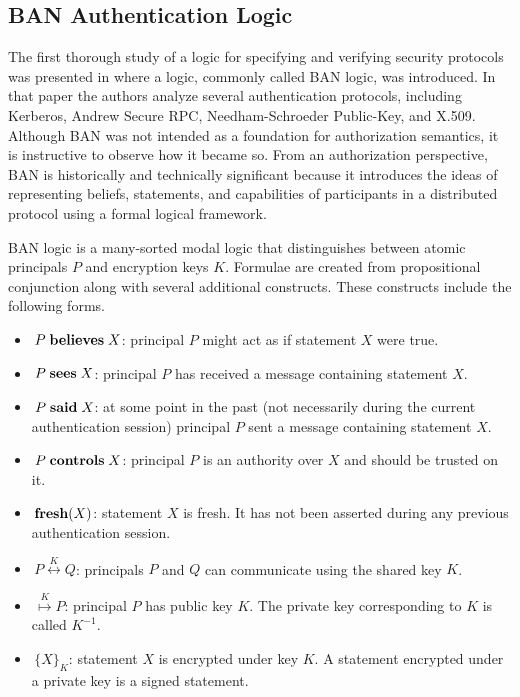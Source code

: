 \subsection{BAN Authentication Logic}

The first thorough study of a logic for specifying and verifying
security protocols was presented in \cite{Burrows:LA} where a logic,
commonly called BAN logic, was introduced.  In that paper the authors
analyze several authentication protocols, including Kerberos, Andrew
Secure RPC, Needham-Schroeder Public-Key, and X.509.  Although BAN was
not intended as a foundation for authorization semantics, it is
instructive to observe how it became so.  From an authorization
perspective, BAN is historically and technically significant because
it introduces the ideas of representing beliefs, statements, and
capabilities of participants in a distributed protocol using a formal
logical framework.

BAN logic is a many-sorted modal logic that distinguishes between
atomic principals $P$ and encryption keys $K$. Formulae are created from
propositional conjunction along with several additional
constructs. These constructs include the following forms.
\begin{itemize}
\item $\,P \;\textbf{believes}\; X$: principal $P$ might act as
  if statement $X$ were true.
\item $\,P \;\textbf{sees}\; X$: principal $P$ has received a
  message containing statement $X$.
\item $\,P \;\textbf{said}\; X$: at some point in the past (not
  necessarily during the current authentication session) principal $P$
  sent a message containing statement $X$.
\item $\,P \;\textbf{controls}\; X$: principal $P$ is an
  authority over $X$ and should be trusted on it.
\item $\,\textbf{fresh}(X)$: statement $X$ is fresh. It has not
  been asserted during any previous authentication session.
\item $\,P \stackrel{K}{\longleftrightarrow} Q$: principals
  $P$ and $Q$ can communicate using the shared key $K$.
\item $\,\stackrel{K}{\longmapsto}P$: principal $P$ has public
  key $K$. The private key corresponding to $K$ is called $K^{-1}$.
\item $\,\{X\}_K$: statement $X$ is encrypted under key $K$. A
  statement encrypted under a private key is a signed statement.
\end{itemize}

